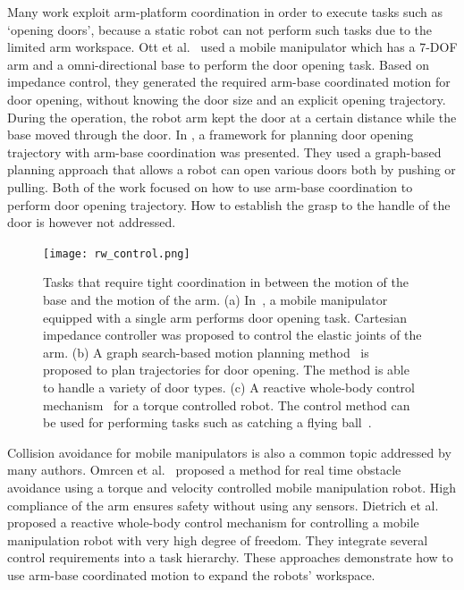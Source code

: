 Many work exploit arm-platform coordination in order to execute tasks such as `opening doors', because a static robot can not perform such tasks due to the limited arm workspace. Ott et al.~\cite{Ott2005} used a mobile manipulator which has a 7-DOF arm and a omni-directional base to perform the door opening task. Based on impedance control, they generated the required arm-base coordinated motion for door opening, without knowing the door size and an explicit opening trajectory. During the operation, the robot arm kept the door at a certain distance while the base moved through the door. In \cite{Chitta2010}, a framework for planning door opening trajectory with arm-base coordination was presented. They used a graph-based planning approach that allows a robot can open various doors both by pushing or pulling. Both of the work focused on how to use arm-base coordination to perform door opening trajectory. How to establish the grasp to the handle of the door is however not addressed.  

\begin{figure}[!htbp]
\centering
\texttt{[image: rw\_control.png]}
\captionsetup{justification=raggedright}
\caption{Tasks that require tight coordination in between the motion of
the base and the motion of the arm. (a) In~\cite{Ott2005}, a mobile manipulator equipped with a single arm performs door opening task. Cartesian impedance controller was proposed to control the elastic joints of the arm. (b) A graph search-based motion planning method~\cite{Chitta2010} is proposed to plan trajectories for door opening. The method is able to handle a variety of door types. (c) A reactive whole-body control mechanism~\cite{Dietrich2011} for a torque controlled robot. The control method can be used for  performing tasks such as catching a flying ball~\cite{birbach2011realtime}. }
\label{fig:rw_control}       
\end{figure}

Collision avoidance for mobile manipulators is also a common topic addressed
by many authors. Omrcen et al.~\cite{Omrcen2003} proposed a method for real time obstacle avoidance using a torque and velocity controlled mobile manipulation robot. High compliance of the arm ensures safety without using any sensors. Dietrich et al.~\cite{Dietrich2011} proposed a reactive whole-body control mechanism for controlling a mobile manipulation robot with very high degree of freedom. They integrate several control requirements into a task hierarchy. These approaches demonstrate how to use arm-base coordinated motion to expand the robots' workspace. 

